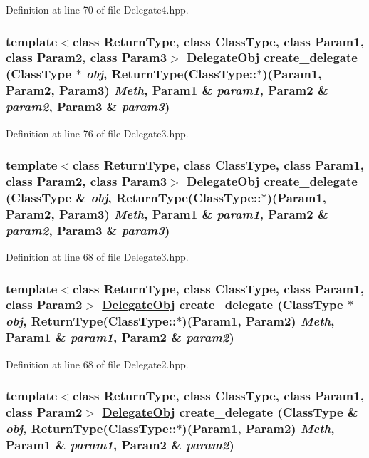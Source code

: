 Definition at line 70 of file Delegate4.hpp.\hypertarget{namespaceDL_a10}{
\subsubsection[create\_\-delegate]{\setlength{\rightskip}{0pt plus 5cm}template$<$class Return\-Type, class Class\-Type, class Param1, class Param2, class Param3$>$ \hyperlink{namespaceDL_a0}{Delegate\-Obj} create\_\-delegate (Class\-Type $\ast$ {\em obj}, Return\-Type(Class\-Type::$\ast$)(Param1, Param2, Param3) {\em Meth}, Param1 \& {\em param1}, Param2 \& {\em param2}, Param3 \& {\em param3})}}
\label{namespaceDL_a10}




Definition at line 76 of file Delegate3.hpp.\hypertarget{namespaceDL_a9}{
\subsubsection[create\_\-delegate]{\setlength{\rightskip}{0pt plus 5cm}template$<$class Return\-Type, class Class\-Type, class Param1, class Param2, class Param3$>$ \hyperlink{namespaceDL_a0}{Delegate\-Obj} create\_\-delegate (Class\-Type \& {\em obj}, Return\-Type(Class\-Type::$\ast$)(Param1, Param2, Param3) {\em Meth}, Param1 \& {\em param1}, Param2 \& {\em param2}, Param3 \& {\em param3})}}
\label{namespaceDL_a9}




Definition at line 68 of file Delegate3.hpp.\hypertarget{namespaceDL_a8}{
\subsubsection[create\_\-delegate]{\setlength{\rightskip}{0pt plus 5cm}template$<$class Return\-Type, class Class\-Type, class Param1, class Param2$>$ \hyperlink{namespaceDL_a0}{Delegate\-Obj} create\_\-delegate (Class\-Type $\ast$ {\em obj}, Return\-Type(Class\-Type::$\ast$)(Param1, Param2) {\em Meth}, Param1 \& {\em param1}, Param2 \& {\em param2})}}
\label{namespaceDL_a8}




Definition at line 68 of file Delegate2.hpp.\hypertarget{namespaceDL_a7}{
\subsubsection[create\_\-delegate]{\setlength{\rightskip}{0pt plus 5cm}template$<$class Return\-Type, class Class\-Type, class Param1, class Param2$>$ \hyperlink{namespaceDL_a0}{Delegate\-Obj} create\_\-delegate (Class\-Type \& {\em obj}, Return\-Type(Class\-Type::$\ast$)(Param1, Param2) {\em Meth}, Param1 \& {\em param1}, Param2 \& {\em param2})}}
\label{namespaceDL_a7}




